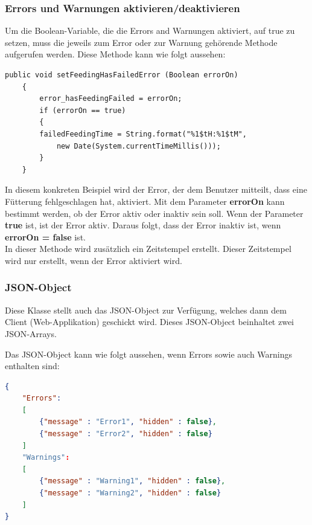 \subsubsection{Errors und Warnungen aktivieren/deaktivieren}
Um die Boolean-Variable, die die Errors and Warnungen aktiviert, auf true zu setzen, muss die jeweils zum Error oder zur Warnung gehörende Methode aufgerufen werden. Diese Methode kann wie folgt aussehen:
\begin{lstlisting}[style=JavaStyle, caption=Error setzen]
	public void setFeedingHasFailedError (Boolean errorOn)
	{
		error_hasFeedingFailed = errorOn;
		if (errorOn == true)
		{
		failedFeedingTime = String.format("%1$tH:%1$tM", 
			new Date(System.currentTimeMillis()));
		}   
	}
\end{lstlisting}
In diesem konkreten Beispiel wird der Error, der dem Benutzer mitteilt, dass eine Fütterung fehlgeschlagen hat, aktiviert. Mit dem Parameter \textbf{errorOn} kann bestimmt werden, ob der Error aktiv oder inaktiv sein soll. Wenn der Parameter \textbf{true} ist, ist der Error aktiv. Daraus folgt, dass der Error inaktiv ist, wenn \textbf{errorOn = false} ist. 
\\ In dieser Methode wird zusätzlich ein Zeitstempel erstellt. Dieser Zeitstempel wird nur erstellt, wenn der Error aktiviert wird. 

\subsubsection{JSON-Object} \label{subsubsec:Array}
Diese Klasse stellt auch das \ac{JSON}-Object zur Verfügung, welches dann dem Client (Web-Applikation) geschickt wird. Dieses \ac{JSON}-Object beinhaltet zwei \ac{JSON}-Arrays.

Das \ac{JSON}-Object kann wie folgt aussehen, wenn Errors sowie auch Warnings enthalten sind:

\begin{lstlisting}[language=json,firstnumber=1, caption=\ac{JSON}-Object mit Errors und Warnings]
{ 
	"Errors": 
	[ 
		{"message" : "Error1", "hidden" : false}, 
		{"message" : "Error2", "hidden" : false} 
	] 
	"Warnings": 
	[ 
		{"message" : "Warning1", "hidden" : false}, 
		{"message" : "Warning2", "hidden" : false} 
	] 
} 
\end{lstlisting}

